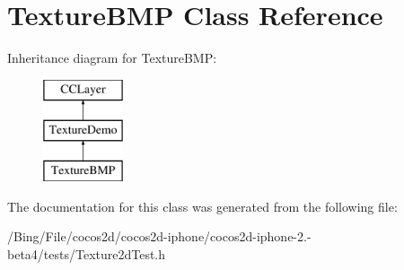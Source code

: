 \hypertarget{interface_texture_b_m_p}{\section{Texture\-B\-M\-P Class Reference}
\label{interface_texture_b_m_p}
}
Inheritance diagram for Texture\-B\-M\-P\-:\begin{figure}[H]
\begin{center}
\leavevmode
\includegraphics[height=3.000000cm]{interface_texture_b_m_p}
\end{center}
\end{figure}


The documentation for this class was generated from the following file\-:\begin{DoxyCompactItemize}
\item 
/\-Bing/\-File/cocos2d/cocos2d-\/iphone/cocos2d-\/iphone-\/2.-\/beta4/tests/Texture2d\-Test.\-h\end{DoxyCompactItemize}
